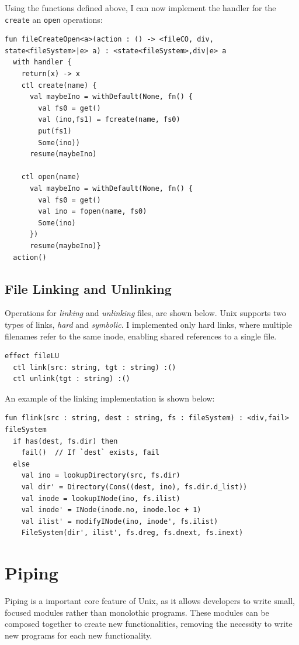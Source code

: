 \documentclass[logo,bsc,singlespacing,parskip]{infthesis}
\begin{document}
Using the functions defined above, I can now implement the handler for the \lstinline{create} an \lstinline{open} operations:

\begin{lstlisting}
fun fileCreateOpen<a>(action : () -> <fileCO, div, state<fileSystem>|e> a) : <state<fileSystem>,div|e> a
  with handler {
    return(x) -> x
    ctl create(name) {
      val maybeIno = withDefault(None, fn() {
        val fs0 = get()
        val (ino,fs1) = fcreate(name, fs0)
        put(fs1)
        Some(ino))
      resume(maybeIno)

    ctl open(name) 
      val maybeIno = withDefault(None, fn() {
        val fs0 = get()
        val ino = fopen(name, fs0)
        Some(ino)
      })
      resume(maybeIno)}  
  action()
\end{lstlisting}

\subsection{File Linking and Unlinking}
Operations for \textit{linking} and \textit{unlinking} files, are shown below. Unix supports two types of links, \textit{hard} and \textit{symbolic}. I implemented only hard links, where multiple filenames refer to the same inode, enabling shared references to a single file.

\begin{lstlisting}
effect fileLU
  ctl link(src: string, tgt : string) :()
  ctl unlink(tgt : string) :()
\end{lstlisting}

An example of the linking implementation is shown below:
\begin{lstlisting}
fun flink(src : string, dest : string, fs : fileSystem) : <div,fail> fileSystem 
  if has(dest, fs.dir) then
    fail()  // If `dest` exists, fail
  else 
    val ino = lookupDirectory(src, fs.dir)
    val dir' = Directory(Cons((dest, ino), fs.dir.d_list))
    val inode = lookupINode(ino, fs.ilist)
    val inode' = INode(inode.no, inode.loc + 1)
    val ilist' = modifyINode(ino, inode', fs.ilist)
    FileSystem(dir', ilist', fs.dreg, fs.dnext, fs.inext)
\end{lstlisting}


\section{Piping}
Piping is a important core feature of Unix,  as it allows developers to write  small, focused modules rather than monolothic programs. These modules can be composed together to create new functionalities, removing the necessity to write new programs for each new functionality.
\end{document}
